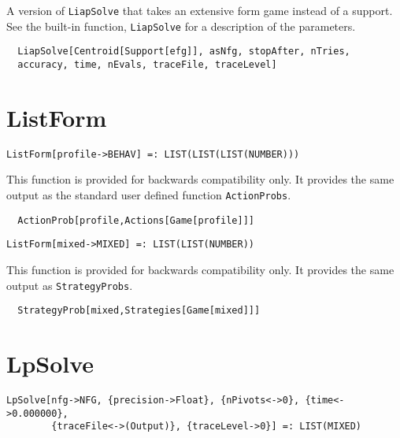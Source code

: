\noindent
A version of \verb+LiapSolve+ that takes an extensive form
game instead of a support.  See the built-in function,
\verb+LiapSolve+ for a description of the parameters.

\udfbody
\begin{verbatim}
  LiapSolve[Centroid[Support[efg]], asNfg, stopAfter, nTries,
  accuracy, time, nEvals, traceFile, traceLevel]
\end{verbatim} 


\section*{ListForm}\label{ExtListForm}
\begin{verbatim}
ListForm[profile->BEHAV] =: LIST(LIST(LIST(NUMBER))) 
\end{verbatim}

\noindent
This function is provided for backwards compatibility only.  It
provides the same output as the standard user defined function \verb+ActionProbs+.

\udfbody
\begin{verbatim}
  ActionProb[profile,Actions[Game[profile]]]
\end{verbatim} 

\newsignature

\begin{verbatim}
ListForm[mixed->MIXED] =: LIST(LIST(NUMBER)) 
\end{verbatim}

\noindent
This function is provided for backwards compatibility only.  It
provides the same output as \verb+StrategyProbs+.

\udfbody
\begin{verbatim}
  StrategyProb[mixed,Strategies[Game[mixed]]]
\end{verbatim} 


\section*{LpSolve}\label{ExtLpSolve}
\begin{verbatim}
LpSolve[nfg->NFG, {precision->Float}, {nPivots<->0}, {time<->0.000000}, 
        {traceFile<->(Output)}, {traceLevel->0}] =: LIST(MIXED) 
\end{verbatim}

